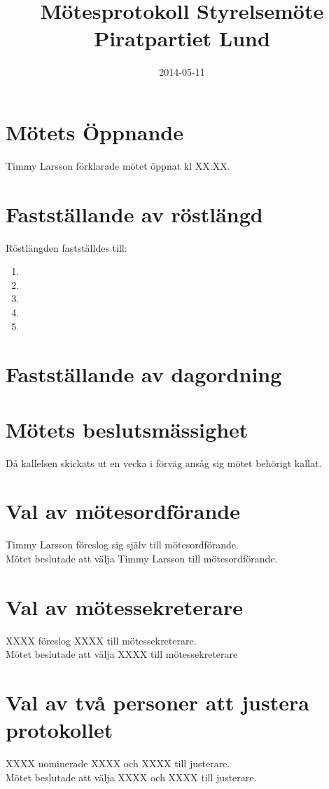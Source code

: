 \documentclass[a4paper,10pt]{article}
\title{\vspace{-1.5in}\textmd{\textbf{Mötesprotokoll Styrelsemöte Piratpartiet Lund}}}
\date{2014-05-11}
\author{}
\begin{document}
\maketitle

\section{Mötets Öppnande}
Timmy Larsson förklarade mötet öppnat kl XX:XX.

\section{Fastställande av röstlängd}
Röstlängden fastställdes till:
\begin{enumerate}
\item 
\item 
\item 
\item 
\item 
\end{enumerate}

\section{Fastställande av dagordning}


\section{Mötets beslutsmässighet}
Då kallelsen skickats ut en vecka i förväg ansåg sig mötet behörigt kallat.

\newpage

\section{Val av mötesordförande}
Timmy Larsson föreslog sig själv till mötesordförande.\\
Mötet beslutade att välja Timmy Larsson till mötesordförande.

\section{Val av mötessekreterare}
XXXX föreslog XXXX till mötessekreterare.\\
Mötet beslutade att välja XXXX till mötessekreterare

\section{Val av två personer att justera protokollet}
XXXX nominerade XXXX och XXXX till justerare.\\
Mötet beslutade att välja XXXX och XXXX till justerare.
\end{document}

